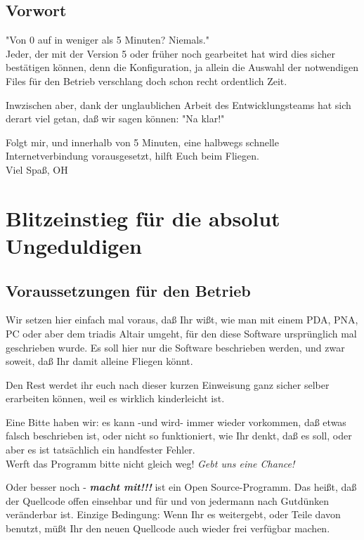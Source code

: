 \newpage
\section*{Vorwort}
"Von 0 auf \xc in weniger als 5 Minuten? Niemals." \\

Jeder, der mit der Version 5 oder früher noch gearbeitet hat wird dies sicher bestätigen können, denn die Konfiguration, ja allein die Auswahl der notwendigen Files für den Betrieb verschlang doch schon recht ordentlich Zeit.


 Inwzischen aber, dank der unglaublichen Arbeit des Entwicklungsteams hat sich derart viel getan, daß wir sagen können: "Na klar!"


 Folgt mir, und innerhalb von 5 Minuten, eine halbwegs schnelle Internetverbindung vorausgesetzt, \xc hilft Euch beim Fliegen. \\[2em]

Viel Spaß, OH
\chapter{Blitzeinstieg für die absolut Ungeduldigen}\label{Blitzeinstieg}
\section{Voraussetzungen für den Betrieb}
Wir setzen hier einfach mal voraus, daß Ihr wißt, wie man mit einem \textsf{PDA}, \textsf{PNA}, \textsf{PC} oder aber dem  triadis \textsf{Altair} umgeht,  für den diese Software ursprünglich mal geschrieben wurde. Es soll hier nur die Software beschrieben werden, und zwar soweit, daß Ihr damit alleine Fliegen könnt.

Den Rest werdet ihr euch nach dieser kurzen Einweisung ganz sicher selber erarbeiten können, weil es wirklich kinderleicht ist.

Eine Bitte haben wir: es kann -und wird- immer wieder vorkommen, daß etwas falsch beschrieben ist, oder nicht so funktioniert, wie Ihr denkt, daß es soll, oder aber es ist tatsächlich ein handfester Fehler.\\[1em]

Werft das Programm bitte nicht gleich weg! \textsl{Gebt  uns eine Chance!}

Oder besser noch - \textsl{\textbf{macht mit!!!}} \xc ist ein Open Source-Programm. Das heißt, daß der Quellcode offen einsehbar und für und von jedermann nach Gutdünken veränderbar ist. Einzige Bedingung: Wenn Ihr es weitergebt, oder Teile davon benutzt, müßt Ihr den neuen Quellcode auch wieder frei verfügbar machen.\\

